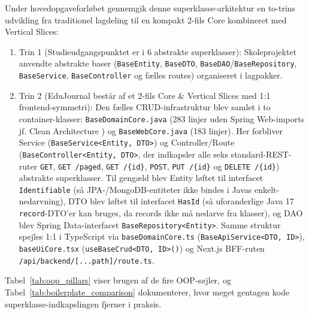 \documentclass[11pt,a4paper]{article}
\begin{document}
Under hovedopgaveforløbet gennemgik denne superklasse-arkitektur en to-trins udvikling fra traditionel lagdeling til en kompakt 2-fils Core kombineret med Vertical Slices:
\begin{enumerate}[noitemsep]
    \item Trin 1 (Studieudgangspunktet er i 6 abstrakte superklasser): Skoleprojektet anvendte abstrakte baser (\texttt{BaseEntity}, \texttt{BaseDTO}, \texttt{BaseDAO}/\texttt{BaseRepository}, \texttt{BaseService}, \texttt{BaseController} og fælles routes) organiseret i lagpakker.
    \item Trin 2 (EduJournal består af et 2-fils Core \& Vertical Slices med 1:1 frontend-symmetri): Den fælles CRUD-infrastruktur blev samlet i to container-klasser: \texttt{BaseDomainCore.java} (283 linjer uden Spring Web-imports jf. Clean Architecture \cite{martin2017}) og \texttt{BaseWebCore.java} (183 linjer). Her forbliver Service (\texttt{BaseService<Entity, DTO>}) og Controller/Route (\texttt{BaseController<Entity, DTO>}, der indkapsler alle seks standard-REST-ruter \texttt{GET}, \texttt{GET /paged}, \texttt{GET /\{id\}}, \texttt{POST}, \texttt{PUT /\{id\}} og \texttt{DELETE /\{id\}}) abstrakte superklasser. Til gengæld blev Entity løftet til interfacet \texttt{Identifiable} (så JPA-/MongoDB-entiteter ikke bindes i Javas enkelt-nedarvning), DTO blev løftet til interfacet \texttt{HasId} (så uforanderlige Java 17 \texttt{record}-DTO'er kan bruges, da records ikke må nedarve fra klasser), og DAO blev Spring Data-interfacet \texttt{BaseRepository<Entity>}. Samme struktur spejles 1:1 i TypeScript via \texttt{baseDomainCore.ts} (\texttt{BaseApiService<DTO, ID>}), \texttt{baseUiCore.tsx} (\texttt{useBaseCrud<DTO, ID>()}) og Next.js BFF-ruten \texttt{/api/backend/[...path]/route.ts}.
\end{enumerate}

Tabel~\ref{tab:oop_pillars} viser brugen af de fire OOP-søjler, og Tabel~\ref{tab:boilerplate_comparison} dokumenterer, hvor meget gentagen kode superklasse-indkapslingen fjerner i praksis.
\end{document}
